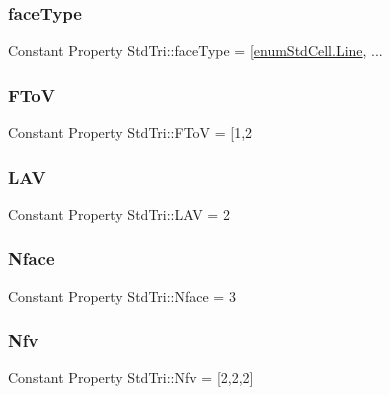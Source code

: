 \subsubsection{\texorpdfstring{face\+Type}{faceType}}
{\footnotesize\ttfamily Constant Property Std\+Tri\+::face\+Type = \mbox{[}\hyperlink{classenum_std_cell_ac4c2fa4e189e76e103f3ff9b1d19b9e7afd257c7a2b7d6efb3bd9f67c8a36d3cd}{enum\+Std\+Cell.\+Line}, ...}

\mbox{\label{class_std_tri_afe62c969151bab1b72cd598c8d5def16}} 
\subsubsection{\texorpdfstring{F\+ToV}{FToV}}
{\footnotesize\ttfamily Constant Property Std\+Tri\+::\+F\+ToV = \mbox{[}1,2}

\mbox{\label{class_std_tri_a5359a0550f151126ce8596157727425c}} 
\subsubsection{\texorpdfstring{L\+AV}{LAV}}
{\footnotesize\ttfamily Constant Property Std\+Tri\+::\+L\+AV = 2}

\mbox{\label{class_std_tri_a9088c3233abd0c78b4de8f6f464c8fb2}} 
\subsubsection{\texorpdfstring{Nface}{Nface}}
{\footnotesize\ttfamily Constant Property Std\+Tri\+::\+Nface = 3}

\mbox{\label{class_std_tri_a5b05b49e8a0156b6047a36776c5fafe9}} 
\subsubsection{\texorpdfstring{Nfv}{Nfv}}
{\footnotesize\ttfamily Constant Property Std\+Tri\+::\+Nfv = \mbox{[}2,2,2\mbox{]}}

\mbox{\label{class_std_tri_a90eaa989bce63d3c2ef4ba8540ee3150}} 
